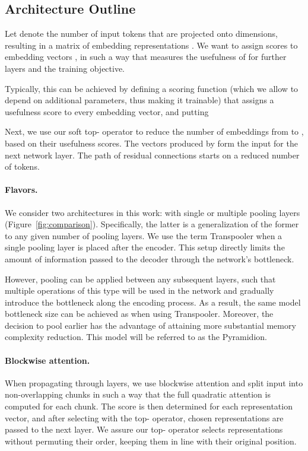 \documentclass{article}
\begin{document}
\subsection{Architecture Outline}
Let  denote the number of input tokens that are projected onto  dimensions, resulting in a matrix of embedding representations . We want to assign scores  to embedding vectors , in such a way that  measures the usefulness of  for further layers and the training objective.

Typically, this can be achieved by defining a scoring function  (which we allow to depend on additional parameters, thus making it trainable) that assigns a usefulness score to every embedding vector, and putting



Next, we use our soft top- operator  to reduce the number of embeddings from  to , based on their usefulness scores. The  vectors produced by  form the input for the next network layer. The path of residual connections starts on a reduced number of tokens.

\paragraph{Flavors.} We consider two architectures in this work: with single or multiple pooling layers (Figure~\ref{fig:comparison}). Specifically, the latter is a generalization of the former to any given number of pooling layers. We use the term Transpooler when a single pooling layer is placed after the encoder. This setup directly limits the amount of information passed to the decoder through the network's bottleneck.

However, pooling can be applied between any subsequent layers, such that multiple operations of this type will be used in the network and gradually introduce the bottleneck along the encoding process. As a result, the same model bottleneck size can be achieved as when using Transpooler. Moreover, the decision to pool earlier has the advantage of attaining more substantial memory complexity reduction. This model will be referred to as the Pyramidion.

\paragraph{Blockwise attention.}
When propagating through layers, we use blockwise attention and split input into non-overlapping chunks in such a way that the full quadratic attention is computed for each chunk. The score is then determined for each representation vector, and after selecting with the top- operator, chosen representations are passed to the next layer. We assure our top- operator selects representations without permuting their order, keeping them in line with their original position. 
\end{document}
